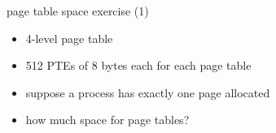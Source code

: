 \usetikzlibrary{arrows.meta,matrix}

\begin{frame}{page table space exercise (1)}
\begin{itemize}
\item 4-level page table
\item 512 PTEs of 8 bytes each for each page table
\vspace{.5cm}
\item suppose a process has exactly one page allocated
\item how much space for page tables?
\iftoggle{heldback}{}{
    \item<2-> 1 page at each level (4KB each)
    \item<2-> exactly one valid entry in each of them
}
\end{itemize}
\end{frame}

